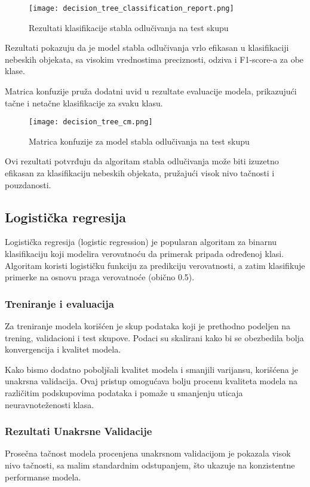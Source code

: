 \documentclass[a4paper,12pt]{article}
\begin{document}
\begin{figure}[h!]
\centering
\texttt{[image: decision\_tree\_classification\_report.png]}
\caption{Rezultati klasifikacije stabla odlučivanja na test skupu}
\label{fig:decision_tree_classification_report}
\end{figure}

Rezultati pokazuju da je model stabla odlučivanja vrlo efikasan u klasifikaciji nebeskih objekata, sa visokim vrednostima preciznosti, odziva i F1-score-a za obe klase.

\clearpage

Matrica konfuzije pruža dodatni uvid u rezultate evaluacije modela, prikazujući tačne i netačne klasifikacije za svaku klasu.

\begin{figure}[h!]
\centering
\texttt{[image: decision\_tree\_cm.png]}
\caption{Matrica konfuzije za model stabla odlučivanja na test skupu}
\label{fig:decision_tree_cm}
\end{figure}

Ovi rezultati potvrđuju da algoritam stabla odlučivanja može biti izuzetno efikasan za klasifikaciju nebeskih objekata, pružajući visok nivo tačnosti i pouzdanosti.

\subsection{Logistička regresija}
Logistička regresija (logistic regression) je popularan algoritam za binarnu klasifikaciju koji modelira verovatnoću da primerak pripada određenoj klasi. Algoritam koristi logističku funkciju za predikciju verovatnosti, a zatim klasifikuje primerke na osnovu praga verovatnoće (obično 0.5).

\subsubsection{Treniranje i evaluacija}
Za treniranje modela korišćen je skup podataka koji je prethodno podeljen na trening, validacioni i test skupove. Podaci su skalirani kako bi se obezbedila bolja konvergencija i kvalitet modela.

Kako bismo dodatno poboljšali kvalitet modela i smanjili varijansu, korišćena je unakrsna validacija. Ovaj pristup omogućava bolju procenu kvaliteta modela na različitim podskupovima podataka i pomaže u smanjenju uticaja neuravnoteženosti klasa.

\subsubsection{Rezultati Unakrsne Validacije}
Prosečna tačnost modela procenjena unakrsnom validacijom je pokazala visok nivo tačnosti, sa malim standardnim odstupanjem, što ukazuje na konzistentne performanse modela.
\end{document}
